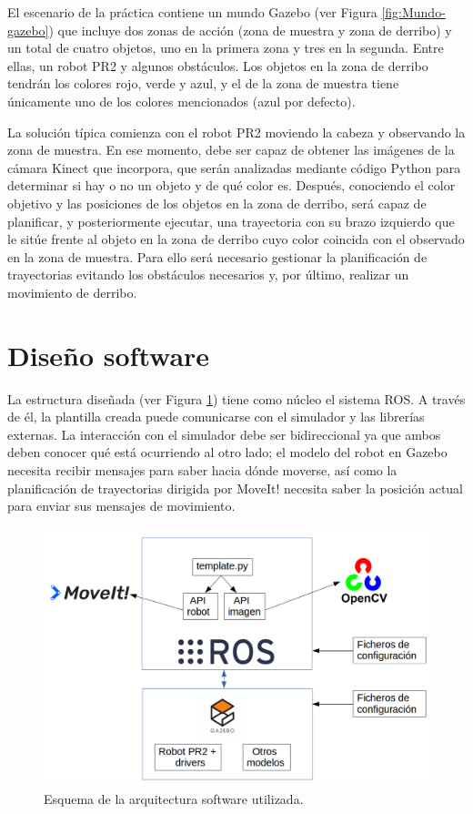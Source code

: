 \documentclass[12pt,spanish,chapterprefix, numbers=noenddot]{book}
\numberwithin{equation}{section}
\numberwithin{figure}{section}
\begin{document}
El escenario de la práctica contiene un mundo Gazebo (ver Figura \ref{fig:Mundo-gazebo}) que incluye dos zonas de acción (zona de muestra y zona de derribo) y un total de cuatro objetos, uno en la primera zona y tres en la segunda. Entre ellas, un robot PR2 y algunos obstáculos. Los objetos en la zona de derribo tendrán los colores rojo, verde y azul, y el de la zona de muestra tiene únicamente uno de los colores mencionados (azul por defecto). 

La solución típica comienza con el robot PR2 moviendo la cabeza y observando la zona de muestra. En ese momento, debe ser capaz de obtener las imágenes de la cámara Kinect que incorpora, que serán analizadas mediante código Python para determinar si hay o no un objeto y de qué color es. 
Después, conociendo el color objetivo y las posiciones de los objetos en la zona de derribo, será capaz de planificar, y posteriormente ejecutar, una trayectoria con su brazo izquierdo que le sitúe frente al objeto en la zona de derribo cuyo color coincida con el observado en la zona de muestra. Para ello será necesario gestionar la planificación de trayectorias evitando los obstáculos necesarios y, por último, realizar un movimiento de derribo.

\section{Diseño software}
La estructura diseñada (ver Figura \ref{fig:tfg_schema}) tiene como núcleo el sistema ROS. A través de él, la plantilla creada puede comunicarse con el simulador y las librerías externas. La interacción con el simulador debe ser bidireccional ya que ambos deben conocer qué está ocurriendo al otro lado; el modelo del robot en Gazebo necesita recibir mensajes para saber hacia dónde moverse, así como la planificación de trayectorias dirigida por MoveIt! necesita saber la posición actual para enviar sus mensajes de movimiento.

\begin{figure}[hbt!]
\centering
\includegraphics[width=12cm]{Figs/tfg_schema.png}
\par
\caption{\label{fig:tfg_schema}Esquema de la arquitectura software utilizada.}
\end{figure}
\end{document}
